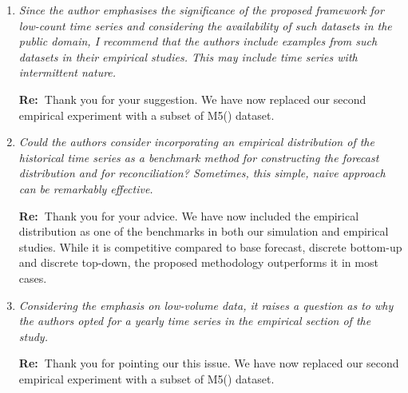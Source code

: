 \documentclass[11pt,a4paper]{article}
\newcommand{\RE}[2][Re:~]{{\color{blue}\textbf{#1}#2}}
\begin{document}
\begin{enumerate}
  \RE{Thank you for highlighting this issue. Indeed, we also did not find studies about the cost of rounding non-integer forecasts. We have now revised and clarified the possibility of rounding non-integer forecasts as follows:
  
  ``Regarding point forecasts, the reconciliation approaches yields non-integer forecasts because they project base forecasts from an incoherent real space onto a coherent real subspace (\citealp{panagiotelisForecastReconciliationGeometric2021}).
  While rounding is a practical way to dealing with non-integer forecasts, the rounded forecasts may not be coherent anymore.
  In terms of distributional forecasts, it can even be more challenging to discretise the distributions while maintaining the probabilistic coherence.''}

  \item \textit{Since the author emphasises the significance of the proposed framework for low-count time series and considering the availability of such datasets in the public domain, I recommend that the authors include examples from such datasets in their empirical studies. This may include time series with intermittent nature.}
  
  \RE{Thank you for your suggestion. We have now replaced our second empirical experiment with a subset of M5(\citealp{makridakisM5AccuracyCompetition2022}) dataset.}

  \item \textit{Could the authors consider incorporating an empirical distribution of the historical time series as a benchmark method for constructing the forecast distribution and for reconciliation? Sometimes, this simple, naive approach can be remarkably effective.}
  
  \RE{Thank you for your advice. We have now included the empirical distribution as one of the benchmarks in both our simulation and empirical studies. While it is competitive compared to base forecast, discrete bottom-up and discrete top-down, the proposed methodology outperforms it in most cases.}
  
  \item \textit{Considering the emphasis on low-volume data, it raises a question as to why the authors opted for a yearly time series in the empirical section of the study.}
 
  \RE{Thank you for pointing our this issue. We have now replaced our second empirical experiment with a subset of M5(\citealp{makridakisM5AccuracyCompetition2022}) dataset.}
  

\end{enumerate}
\end{document}
